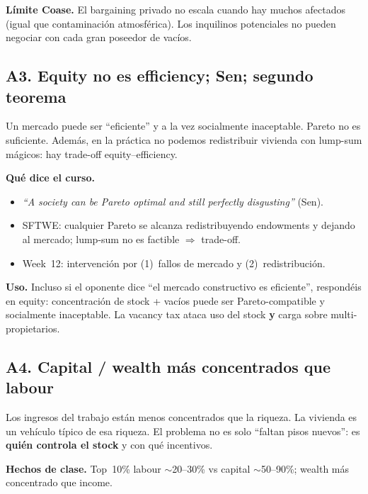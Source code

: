 \documentclass[11pt,a4paper]{report}
\begin{document}
\textbf{L\'imite Coase.} El bargaining privado no escala cuando hay muchos
afectados (igual que contaminaci\'on atmosf\'erica). Los inquilinos potenciales
no pueden negociar con cada gran poseedor de vac\'ios.

\subsection{A3. Equity no es efficiency; Sen; segundo teorema}

\begin{intuicion}
Un mercado puede ser ``eficiente'' y a la vez socialmente inaceptable.
Pareto no es suficiente. Adem\'as, en la pr\'actica no podemos redistribuir
vivienda con lump-sum m\'agicos: hay trade-off equity--efficiency.
\end{intuicion}

\textbf{Qu\'e dice el curso.}
\begin{itemize}
  \item \emph{``A society can be Pareto optimal and still perfectly disgusting''} (Sen).
  \item SFTWE: cualquier Pareto se alcanza redistribuyendo endowments y dejando al mercado;
        lump-sum no es factible $\Rightarrow$ trade-off.
  \item Week~12: intervenci\'on por (1)~fallos de mercado y (2)~redistribuci\'on.
\end{itemize}

\textbf{Uso.} Incluso si el oponente dice ``el mercado constructivo es eficiente'',
respond\'eis en equity: concentraci\'on de stock + vac\'ios puede ser
Pareto-compatible y socialmente inaceptable. La vacancy tax ataca uso del stock
\textbf{y} carga sobre multi-propietarios.

\subsection{A4. Capital / wealth m\'as concentrados que labour}

\begin{intuicion}
Los ingresos del trabajo est\'an menos concentrados que la riqueza.
La vivienda es un veh\'iculo t\'ipico de esa riqueza. El problema no es solo
``faltan pisos nuevos'': es \textbf{qui\'en controla el stock} y con qu\'e incentivos.
\end{intuicion}

\textbf{Hechos de clase.} Top~10\% labour $\sim$20--30\% vs capital $\sim$50--90\%;
wealth m\'as concentrado que income.
\end{document}
